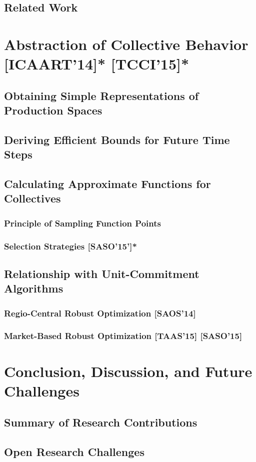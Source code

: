 \documentclass[10pt,a4paper]{book}
\begin{document}
\section{Related Work}

\chapter{Abstraction of Collective Behavior [ICAART'14]* [TCCI'15]*}
\section{Obtaining Simple Representations of Production Spaces}
\section{Deriving Efficient Bounds for Future Time Steps}
\section{Calculating Approximate Functions for Collectives}
\subsection{Principle of Sampling Function Points}
\subsection{Selection Strategies [SASO'15']*}
\section{Relationship with Unit-Commitment Algorithms}
\subsection{Regio-Central Robust Optimization [SAOS'14]}
\subsection{Market-Based Robust Optimization [TAAS'15] [SASO'15]}

\chapter{Conclusion, Discussion, and Future Challenges}
\section{Summary of Research Contributions}
\section{Open Research Challenges}
\end{document}
